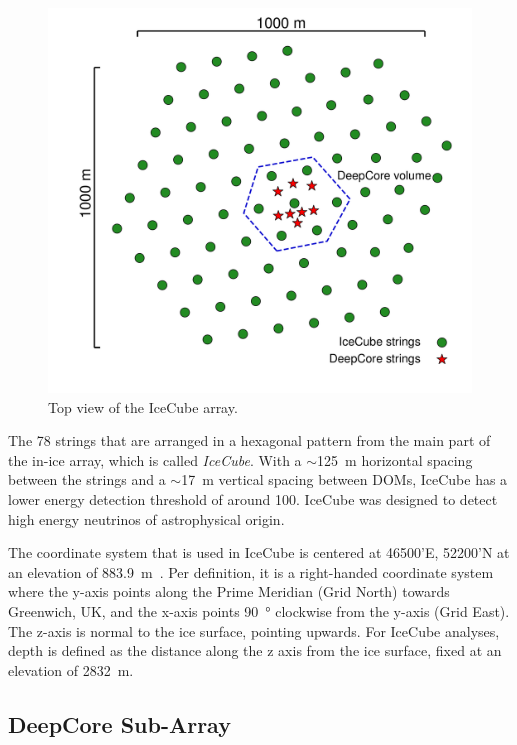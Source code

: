 \begin{figure}
    \includegraphics[trim={2.0cm, 1.5cm, 0, 0}, clip, width=0.65\linewidth]{figures/icecube_deepcore/icecube_top_view_bw.pdf}
    \caption[IceCube top view]{Top view of the IceCube array.}
\end{figure}

The 78 strings that are arranged in a hexagonal pattern from the main part of the in-ice array, which is called \textit{IceCube}. With a $\sim$\SI{125}{\meter} horizontal spacing between the strings and a $\sim$\SI{17}{\meter} vertical spacing between DOMs, IceCube has a lower energy detection threshold of around \SI{100}{\gev}. IceCube was designed to detect high energy neutrinos of astrophysical origin.

The coordinate system that is used in IceCube is centered at 46500'E, 52200'N at an elevation of \SI{883.9}{\meter}~. Per definition, it is a right-handed coordinate system where the y-axis points along the Prime Meridian (Grid North) towards Greenwich, UK, and the x-axis points \SI{90}{\degree} clockwise from the y-axis (Grid East). The z-axis is normal to the ice surface, pointing upwards. For IceCube analyses, depth is defined as the distance along the z axis from the ice surface, fixed at an elevation of \SI{2832}{\meter}.


\subsection{DeepCore Sub-Array} 

